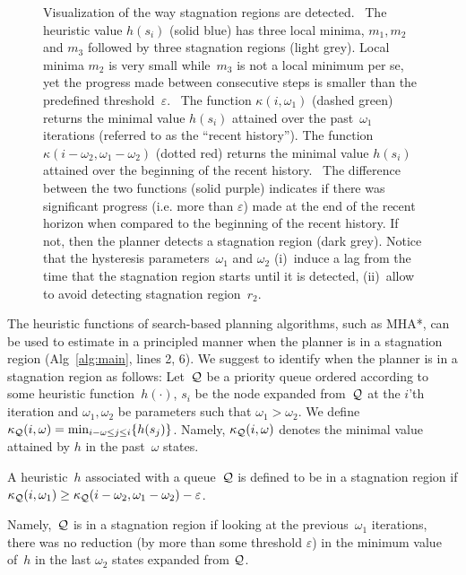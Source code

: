 \documentclass{article}
\begin{document}
\begin{figure}[t]
{  }
  \vspace{-1mm}
  \caption{%
    Visualization of the way stagnation regions are detected.   
	~The heuristic value $h(s_i)$ (solid blue) has three local minima, $m_1, m_2$ and $m_3$ followed by three stagnation regions (light grey). Local minima $m_2$ is very small while~$m_3$ is not a local minimum per se, yet the progress made between consecutive steps is smaller than the predefined threshold~$\varepsilon$.
    ~The function $\kappa(i,\omega_1)$ (dashed green) returns the minimal value $h(s_i)$ attained over the past~$\omega_1$ iterations (referred to  as the ``recent history'').
    The function $\kappa(i-\omega_2,\omega_1-\omega_2)$ (dotted red) returns the minimal value $h(s_i)$ attained over the beginning of the recent history.
    ~The difference between the two functions (solid purple) indicates if there was significant progress (i.e. more than $\varepsilon$) made at the end of the recent horizon when compared to the beginning of the recent history. 
    If not, then the planner detects a stagnation region (dark grey).
		Notice that the hysteresis parameters~$\omega_1$ and $\omega_2$ 
		(i)~induce a lag from the time that the stagnation region starts until it is detected,
		(ii)~allow to avoid detecting stagnation region~$r_2$.  
		}%

  \label{fig:filmstrip-local-min}%

  \vspace{-4.5mm}

\end{figure}


The heuristic functions of search-based planning algorithms, such as MHA*, can be used to estimate in a principled manner when the planner is in a stagnation region (Alg~\ref{alg:main}, lines 2, 6). 
%
We suggest to identify when the planner is in a stagnation region as follows:
Let~$\mathcal{Q}$ be a priority queue 
ordered according to some heuristic function~$h(\cdot)$,
$s_i$ be the node expanded from~$\mathcal{Q}$ at the $i$'th iteration and $\omega_1, \omega_2$ be parameters such that $\omega_1 > \omega_2$.
%
We define 
$\kappa_{\mathcal{Q}}(i, \omega) = \min_{i-\omega \leq j \leq i} \{ h(s_j)\}$.
Namely, $\kappa_{\mathcal{Q}}(i, \omega)$ denotes the minimal value attained by $h$ in the past~$\omega$ states. 
%
\begin{definition}
A heuristic~$h$ associated with a queue~$\mathcal{Q}$ is defined to be in a stagnation region if 
$\kappa_{\mathcal{Q}}(i, \omega_1) \geq \kappa_{\mathcal{Q}}(i - \omega_2, \omega_1 - \omega_2) - \varepsilon$.
\end{definition}
\noindent Namely,~$\mathcal{Q}$ is in a stagnation region if looking at the previous~$\omega_1$ iterations, 
there was no reduction 
(by more than some threshold $\varepsilon$) 
in the minimum value of~$h$ 
in the last $\omega_2$ states expanded from $\mathcal{Q}$.
\end{document}
